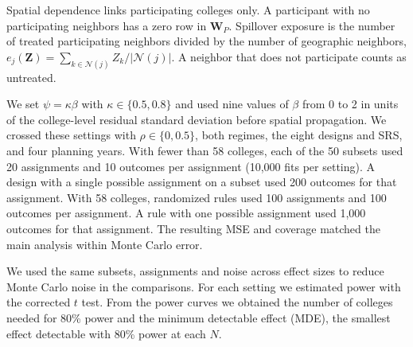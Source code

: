 \documentclass[11pt]{article}
\begin{document}
Spatial dependence links participating colleges only. A participant with
no participating neighbors has a zero row in $\mathbf{W}_P$. Spillover
exposure is the number of treated participating neighbors divided by the
number of geographic neighbors,
$e_j(\mathbf{Z})=\sum_{k\in\mathcal{N}(j)}Z_k/|\mathcal{N}(j)|$.
A neighbor that does not participate counts as untreated.

We set $\psi=\kappa\beta$ with $\kappa \in \{0.5,0.8\}$ and used nine
values of $\beta$ from 0 to 2 in units of the college-level residual
standard deviation before spatial propagation. We crossed these settings with $\rho \in \{0,0.5\}$,
both regimes, the eight designs and SRS, and four planning years. With
fewer than 58 colleges, each of the 50 subsets used 20 assignments and
10 outcomes per assignment (10,000 fits per setting). A design with a
single possible assignment on a subset used 200 outcomes for that
assignment. With 58 colleges, randomized rules used 100 assignments and 100
outcomes per assignment. A rule with one possible assignment used
1,000 outcomes for that assignment. The resulting MSE and coverage
matched the main analysis within Monte Carlo error.

We used the same subsets, assignments and noise across effect sizes
to reduce Monte Carlo noise in the comparisons. For each setting we
estimated power with the corrected $t$ test. From the power curves we
obtained the number of colleges needed for 80\% power and the minimum
detectable effect (MDE), the smallest effect detectable with 80\% power
at each $N$.
\end{document}
